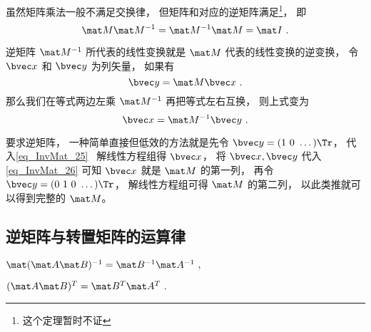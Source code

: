 虽然矩阵乘法一般不满足交换律， 但矩阵和对应的逆矩阵满足\footnote{这个定理暂时不证}， 即
\begin{equation}
\mat M\mat M^{-1} = \mat M^{-1} \mat M = \mat I~.
\end{equation}

逆矩阵 $\mat M^{-1}$ 所代表的线性变换就是 $\mat M$ 代表的线性变换的逆变换， 令 $\bvec x$ 和 $\bvec y$ 为列矢量， 如果有
\begin{equation}\label{eq_Mat_25}
\bvec y = \mat M \bvec x~.
\end{equation}
那么我们在等式两边左乘 $\mat M^{-1}$ 再把等式左右互换， 则上式变为
\begin{equation}\label{eq_Mat_26}
\bvec x = \mat M^{-1} \bvec y~.
\end{equation}

要求逆矩阵， 一种简单直接但低效的方法就是先令 $\bvec y = (1\ 0\ \dots)\Tr$， 代入\autoref{eq_InvMat_25}~ 解线性方程组得 $\bvec x$， 将 $\bvec x, \bvec y$ 代入\autoref{eq_InvMat_26} 可知 $\bvec x$ 就是 $\mat M$ 的第一列， 再令 $\bvec y = (0\ 1\ 0\ \dots)\Tr$， 解线性方程组可得 $\mat M$ 的第二列， 以此类推就可以得到完整的 $\mat M$。

\subsection{逆矩阵与转置矩阵的运算律}
$\mat (\mat A \mat B)^{-1}=\mat B^{-1} \mat A^{-1}~,$

$(\mat A \mat B)^T=\mat B^T \mat A^T~.$